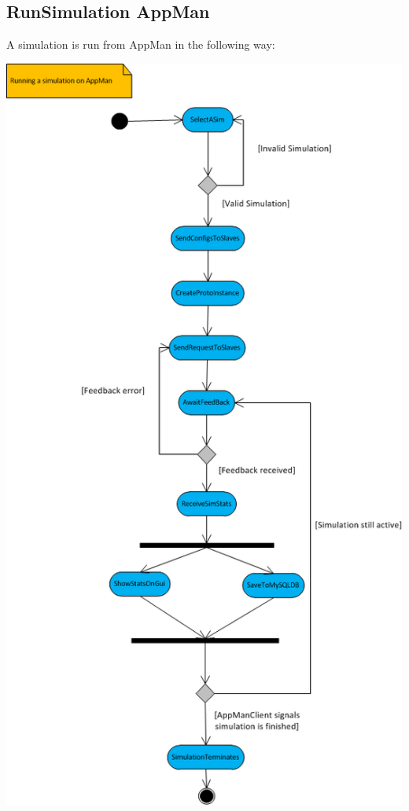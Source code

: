 \documentclass[a4paper,12pt,final]{article}
\begin{document}
\subsection{RunSimulation AppMan}
A simulation is run from AppMan in the following way:
\begin{center}
\includegraphics[scale=0.8]{RunningASimOnAppMan.png}
\end{center}
\end{document}
